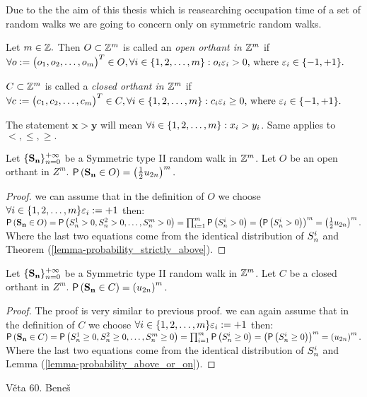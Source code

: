 \begin{rem}
  Due to the the aim of this thesis which is reasearching occupation time of a set of random walks we are going to concern only on symmetric random walks.
\end{rem}
\begin{defn}[Orthant]
  Let $m \in \mathbb{Z}.$ Then $O\subset \mathbb{Z}^m$ is called an \emph{open orthant in $\mathbb{Z}^m$} if $\forall o:= \begin{pmatrix}
  o_1, o_2, \ldots, o_m
  \end{pmatrix}^T \in O, \forall i \in \{1,2,\ldots, m\}:o_i\varepsilon_i>0 \text{, where } \varepsilon_i\in \{-1,+1\}.$

  $C\subset \mathbb{Z}^m$ is called a \emph{closed orthant in $\mathbb{Z}^m$} if $\forall c:= \begin{pmatrix}
  c_1, c_2, \ldots, c_m
\end{pmatrix}^T \in C, \forall i \in \{1,2,\ldots, m\}:c_i\varepsilon_i\geq 0 \text{, where } \varepsilon_i\in \{-1,+1\}.$
\end{defn}
\begin{rem}
  The statement $\mathbf{x}>\mathbf{y}$ will mean $\forall i \in \{1,2,\ldots, m\}:x_i>y_i$. Same applies to $<,\leq, \geq.$
\end{rem}
\begin{thm}\label{thm-prob_being_open_orthant}
  Let $\{\mathbf{\mathbf{S_n}}\}_{n=0}^{+\infty}$ be a Symmetric type II random walk in $\mathbb{Z}^m$. Let $O$ be an open orthant in $Z^m$. $\operatorname{\textsf{P}} \left(\mathbf{S_n}\in O\right)=\left( \frac{1}{2} u_{2n}\right)^m.$
\end{thm}
\begin{proof}
  \Wlog we can assume that in the definition of $O$ we choose $\forall i \in \{1,2,\ldots, m\} \varepsilon_i := +1$ then:
  $\pr \left(\mathbf{S_n}\in O\right)
  =\pr \left(\s[1]>0, \s[2]>0, \ldots, \s[m]>0\right)
  =\prod_{i=1}^m \pr \left(\s[i]>0\right)
  =\left(\pr \left( \s>0\right)\right)^m
  =\left(\h u_{2n}\right)^m.$
  Where the last two equations come from the identical distribution of $\s$ and Theorem (\ref{lemma-probability_strictly_above}).
\end{proof}
\begin{thm}\label{thm-prob_being_closed_orthant}
  Let $\{\mathbf{\mathbf{S_n}}\}_{n=0}^{+\infty}$ be a Symmetric type II random walk in $\mathbb{Z}^m$. Let $C$ be a closed orthant in $Z^m$. $\operatorname{\textsf{P}} \left(\mathbf{S_n}\in C\right)=\left(u_{2n}\right)^m.$
\end{thm}
\begin{proof}
  The proof is very similar to previous proof.
  \Wlog we can again assume that in the definition of $C$ we choose $\forall i \in \{1,2,\ldots, m\} \varepsilon_i := +1$ then:
  $\pr \left(\mathbf{S_n}\in C\right)
  =\pr \left(\s[1]\geq0, \s[2]\geq0, \ldots, \s[m]\geq0\right)
  =\prod_{i=1}^m \pr \left(\s[i]\geq 0\right)
  =\left(\pr \left( \s\geq0\right)\right)^m
  =\left(u_{2n}\right)^m.$
  Where the last two equations come from the identical distribution of $\s$ and Lemma (\ref{lemma-probability_above_or_on}).
\end{proof}













\begin{thm}
  Věta 60. Beneš
\end{thm}
